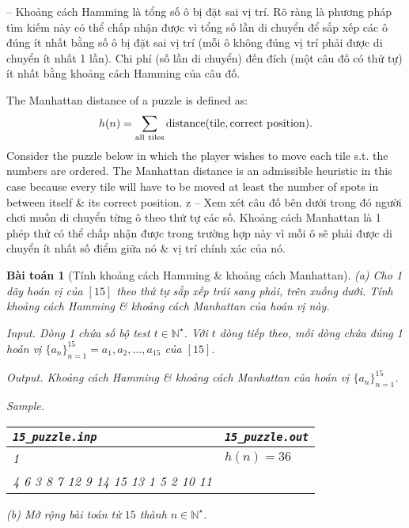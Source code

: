\documentclass{article}
\newtheorem{baitoan}{Bài toán}
\begin{document}
-- Khoảng cách Hamming là tổng số ô bị đặt sai vị trí. Rõ ràng là phương pháp tìm kiếm này có thể chấp nhận được vì tổng số lần di chuyển để sắp xếp các ô đúng ít nhất bằng số ô bị đặt sai vị trí (mỗi ô không đúng vị trí phải được di chuyển ít nhất 1 lần). Chi phí (số lần di chuyển) đến đích (một câu đố có thứ tự) ít nhất bằng khoảng cách Hamming của câu đố.

The Manhattan distance of a puzzle is defined as:
\begin{equation*}
	h(n) = \sum_{\rm all\ tiles} {\rm distance}(\mbox{tile},\mbox{correct position}).
\end{equation*}
Consider the puzzle below in which the player wishes to move each tile s.t. the numbers are ordered. The Manhattan distance is an admissible heuristic in this case because every tile will have to be moved at least the number of spots in between itself \& its correct position.
z
-- Xem xét câu đố bên dưới trong đó người chơi muốn di chuyển từng ô theo thứ tự các số. Khoảng cách Manhattan là 1 phép thử có thể chấp nhận được trong trường hợp này vì mỗi ô sẽ phải được di chuyển ít nhất số điểm giữa nó \& vị trí chính xác của nó.

\begin{baitoan}[Tính khoảng cách Hamming \& khoảng cách Manhattan]
	 (a) Cho 1 dãy hoán vị của $[15]$ theo thứ tự sắp xếp trái sang phải, trên xuống dưới. Tính khoảng cách Hamming \& khoảng cách Manhattan của hoán vị này.
	 \item {\sf Input.} Dòng 1 chứa số bộ test $t\in\mathbb{N}^\star$. Với $t$ dòng tiếp theo, mỗi dòng chứa đúng 1 hoán vị $\{a_n\}_{n=1}^{15} = a_1,a_2,\ldots,a_{15}$ của $[15]$.
	 \item {\sf Output.} Khoảng cách Hamming \& khoảng cách Manhattan của hoán vị $\{a_n\}_{n=1}^{15}$.
	 \item {\sf Sample.}
	 \begin{table}[H]
	 	\centering
	 	\begin{tabular}{|l|l|}
	 		\hline
	 		\verb|15_puzzle.inp| & \verb|15_puzzle.out| \\
	 		\hline
	 		1 & $h(n) = 36$ \\
	 		4 6 3 8 7 12 9 14 15 13 1 5 2 10 11 &  \\
	 		\hline
	 	\end{tabular}
	 \end{table}
	 \noindent(b) Mở rộng bài toán từ $15$ thành $n\in\mathbb{N}^\star$.
\end{baitoan}

\end{document}
